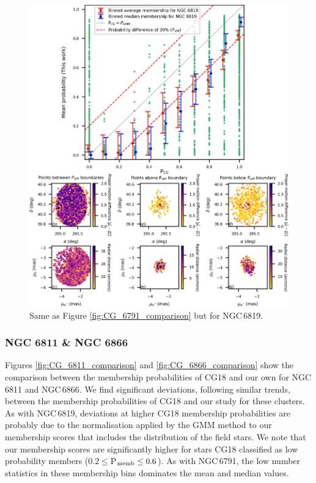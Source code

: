 \begin{figure}[hbtp]
    \centering
    \includegraphics[width=\linewidth]{Chapter4/NGC6819_CG_comparison.png}
    \caption[Comparison of membership probabilities for NGC\,6819]{Same as Figure \ref{fig:CG_6791_comparison} but for NGC\,6819.}
    \label{fig:CG_6819_comparison}
\end{figure}

\subsubsection{NGC 6811 \& NGC 6866}

Figures \ref{fig:CG_6811_comparison} and \ref{fig:CG_6866_comparison} show the comparison between the membership probabilities of CG18 and our own for NGC\,6811 and NGC\,6866. We find significant deviations, following similar trends, between the membership probabilities of CG18 and our study for these clusters. As with NGC\,6819, deviations at higher CG18 membership probabilities are probably due to the normalisation applied by the GMM method to our membership scores that includes the distribution of the field stars. We note that our membership scores are significantly higher for stars CG18 classified as low probability members ($0.2 \leq $P$_{\rm memb} \leq 0.6$). As with NGC\,6791, the low number statistics in these membership bins dominates the mean and median values.

